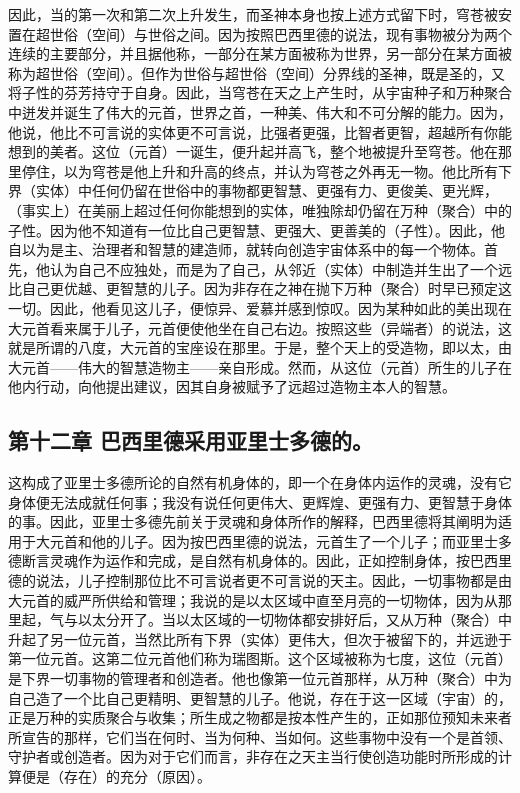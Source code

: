 因此，当的第一次和第二次上升发生，而圣神本身也按上述方式留下时，穹苍被安置在超世俗（空间）与世俗之间。因为按照巴西里德的说法，现有事物被分为两个连续的主要部分，并且据他称，一部分在某方面被称为世界，另一部分在某方面被称为超世俗（空间）。但作为世俗与超世俗（空间）分界线的圣神，既是圣的，又将子性的芬芳持守于自身。因此，当穹苍在天之上产生时，从宇宙种子和万种聚合中迸发并诞生了伟大的元首，世界之首，一种美、伟大和不可分解的能力。因为，他说，他比不可言说的实体更不可言说，比强者更强，比智者更智，超越所有你能想到的美者。这位（元首）一诞生，便升起并高飞，整个地被提升至穹苍。他在那里停住，以为穹苍是他上升和升高的终点，并认为穹苍之外再无一物。他比所有下界（实体）中任何仍留在世俗中的事物都更智慧、更强有力、更俊美、更光辉，（事实上）在美丽上超过任何你能想到的实体，唯独除却仍留在万种（聚合）中的子性。因为他不知道有一位比自己更智慧、更强大、更善美的（子性）。因此，他自以为是主、治理者和智慧的建造师，就转向创造宇宙体系中的每一个物体。首先，他认为自己不应独处，而是为了自己，从邻近（实体）中制造并生出了一个远比自己更优越、更智慧的儿子。因为非存在之神在抛下万种（聚合）时早已预定这一切。因此，他看见这儿子，便惊异、爱慕并感到惊叹。因为某种如此的美出现在大元首看来属于儿子，元首便使他坐在自己右边。按照这些（异端者）的说法，这就是所谓的八度，大元首的宝座设在那里。于是，整个天上的受造物，即以太，由大元首——伟大的智慧造物主——亲自形成。然而，从这位（元首）所生的儿子在他内行动，向他提出建议，因其自身被赋予了远超过造物主本人的智慧。\par


\subsection{第十二章 巴西里德采用亚里士多德的。}

这构成了亚里士多德所论的自然有机身体的，即一个在身体内运作的灵魂，没有它身体便无法成就任何事；我没有说任何更伟大、更辉煌、更强有力、更智慧于身体的事。因此，亚里士多德先前关于灵魂和身体所作的解释，巴西里德将其阐明为适用于大元首和他的儿子。因为按巴西里德的说法，元首生了一个儿子；而亚里士多德断言灵魂作为运作和完成，是自然有机身体的。因此，正如控制身体，按巴西里德的说法，儿子控制那位比不可言说者更不可言说的天主。因此，一切事物都是由大元首的威严所供给和管理；我说的是以太区域中直至月亮的一切物体，因为从那里起，气与以太分开了。当以太区域的一切物体都安排好后，又从万种（聚合）中升起了另一位元首，当然比所有下界（实体）更伟大，但次于被留下的，并远逊于第一位元首。这第二位元首他们称为瑞图斯。这个区域被称为七度，这位（元首）是下界一切事物的管理者和创造者。他也像第一位元首那样，从万种（聚合）中为自己造了一个比自己更精明、更智慧的儿子。他说，存在于这一区域（宇宙）的，正是万种的实质聚合与收集；所生成之物都是按本性产生的，正如那位预知未来者所宣告的那样，它们当在何时、当为何种、当如何。这些事物中没有一个是首领、守护者或创造者。因为对于它们而言，非存在之天主当行使创造功能时所形成的计算便是（存在）的充分（原因）。\par

